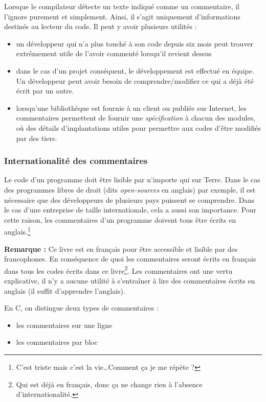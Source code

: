 \documentclass[../../../main.tex]{subfiles}
\begin{document}
Lorsque le compilateur détecte un texte indiqué comme un commentaire, il l'ignore purement et simplement. Ainsi, il s'agit uniquement d'informations destinés au lecteur du code. Il peut y avoir plusieurs utilités :
\begin{itemize}
	\item un développeur qui n'a plus touché à son code depuis six mois peut trouver extrêmement utile de l'avoir commenté lorsqu'il revient dessus
	\item dans le cas d'un projet conséquent, le développement est effectué en équipe. Un développeur peut avoir besoin de comprendre/modifier ce qui a déjà été écrit par un autre.
	\item lorsqu'une bibliothèque est fournie à un client ou publiée sur Internet, les commentaires permettent de fournir une \textit{spécification} à chacun des modules, où des détails d'implantations utiles pour permettre aux codes d'être modifiés par des tiers.
\end{itemize}
\subsubsection{Internationalité des commentaires}\label{ssub:internationalit_des_commentaires}
Le code d'un programme doit être lisible par n'importe qui sur Terre. Dans le cas des programmes libres de droit (dits \textit{open-sources} en anglais) par exemple, il est nécessaire que des développeurs de plusieurs pays puissent se comprendre. Dans le cas d'une entreprise de taille internationale, cela a aussi son importance. Pour cette raison, les commentaires d'un programme doivent tous être écrits en anglais.\footnote{C'est triste mais c'est la vie\dots Comment ça je me répète ?}

\textbf{Remarque :} Ce livre est en français pour être accessible et lisible par des francophones. En conséquence de quoi les commentaires seront écrits en français dans tous les codes écrits dans ce livre\footnote{Qui est déjà en français, donc ça ne change rien à l'absence d'internationalité.}. Les commentaires ont une vertu explicative, il n'y a aucune utilité à s'entraîner à lire des commentaires écrits en anglais (il suffit d'apprendre l'anglais).

En C, on distingue deux types de commentaires :
\begin{itemize}
	\item les commentaires sur une ligne
	\item les commentaires par bloc
\end{itemize}
\end{document}
